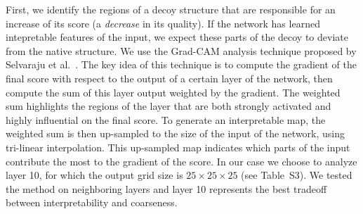 \documentclass{bioinfo}
\begin{document}
First, we identify the regions of a decoy structure that are
responsible for an increase of its score (a \emph{decrease} in its
quality). If the network has learned intepretable features of the
input, we expect these parts of the decoy to deviate from the native
structure.
%
We use the Grad-CAM analysis technique proposed by Selvaraju et
al.~\citep{selvaraju2016grad}. The key idea of this technique is to
compute the gradient of the final score with respect to the output of
a certain layer of the network, then compute the sum of this layer
output weighted by the gradient.
The weighted sum highlights the regions of the layer that are both
strongly activated and highly influential on the final score. To
generate an interpretable map, the weighted sum is then up-sampled to
the size of the input of the network, using tri-linear interpolation.
%
This up-sampled map indicates which parts of the input contribute
the most to the gradient of the score.  In our case we choose to
analyze layer 10, for which the output grid size is $25\times 25\times
25$ (see Table~S3).  We tested the method on neighboring layers and
layer 10 represents the best tradeoff between interpretability and
coarseness.
\end{document}
